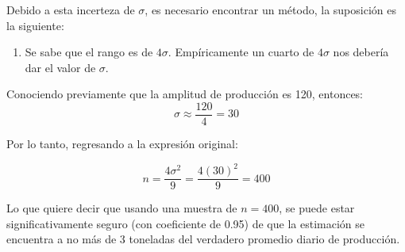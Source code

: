 \begin{solution}
\linea 

Debido a esta incerteza de $\sigma$, es necesario encontrar un método, la suposición es la siguiente: 
\begin{enumerate}
    \item Se sabe que el rango es de $4\sigma$. Empíricamente un cuarto de $4\sigma$ nos debería dar el valor de $\sigma$.
\end{enumerate}

\linea 

Conociendo previamente que la amplitud de producción es 120, entonces: 
$$\sigma \approx \frac{120}{4}= 30$$

Por lo tanto, regresando a la expresión original: 

$$n=\frac{4\sigma^2}{9}= \frac{4(30)^2}{9}=400$$

\linea 

Lo que quiere decir que usando una muestra de $n=400$, se puede estar significativamente seguro (con coeficiente de 0.95) de que la estimación se encuentra a no más de 3 toneladas del verdadero promedio diario de producción.  
\end{solution}